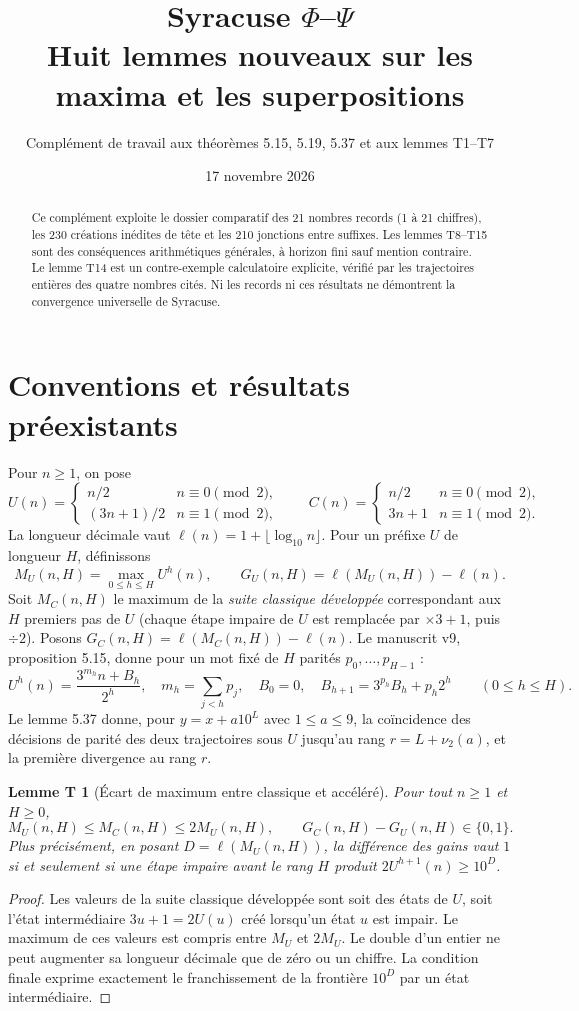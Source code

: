 \documentclass[11pt,a4paper]{article}
\title{Syracuse $\Phi$--$\Psi$\\Huit lemmes nouveaux sur les maxima et les superpositions}
\author{Complément de travail aux théorèmes 5.15, 5.19, 5.37 et aux lemmes T1--T7}
\date{17 novembre 2026}
\newtheorem{lemmet}{Lemme T}
\newcommand{\ellg}{\ell}
\newcommand{\UU}{U}
\newcommand{\CC}{C}
\begin{document}
\maketitle
\begin{abstract}
Ce complément exploite le dossier comparatif des 21 nombres records (1 à 21 chiffres), les 230 créations inédites de tête et les 210 jonctions entre suffixes. Les lemmes T8--T15 sont des conséquences arithmétiques générales, à horizon fini sauf mention contraire. Le lemme T14 est un contre-exemple calculatoire explicite, vérifié par les trajectoires entières des quatre nombres cités. Ni les records ni ces résultats ne démontrent la convergence universelle de Syracuse.
\end{abstract}

\section*{Conventions et résultats préexistants}
Pour $n\ge1$, on pose
\[
 \UU(n)=\begin{cases}n/2&n\equiv0\pmod2,\\(3n+1)/2&n\equiv1\pmod2,\end{cases}
 \qquad
 \CC(n)=\begin{cases}n/2&n\equiv0\pmod2,\\3n+1&n\equiv1\pmod2.\end{cases}
\]
La longueur décimale vaut $\ellg(n)=1+\lfloor\log_{10}n\rfloor$.
Pour un préfixe $\UU$ de longueur $H$, définissons
\[
 M_U(n,H)=\max_{0\le h\le H}\UU^h(n),\qquad
 G_U(n,H)=\ellg(M_U(n,H))-\ellg(n).
\]
Soit $M_C(n,H)$ le maximum de la \emph{suite classique développée} correspondant aux $H$ premiers pas de $\UU$ (chaque étape impaire de $\UU$ est remplacée par $\times3+1$, puis $\div2$). Posons $G_C(n,H)=\ellg(M_C(n,H))-\ellg(n)$.
Le manuscrit v9, proposition 5.15, donne pour un mot fixé de $H$ parités $p_0,\ldots,p_{H-1}$ :
\[
 \UU^h(n)=\frac{3^{m_h}n+B_h}{2^h},\quad
 m_h=\sum_{j<h}p_j,\quad B_0=0,\quad
 B_{h+1}=3^{p_h}B_h+p_h2^h\qquad(0\le h\le H).
\]
Le lemme 5.37 donne, pour $y=x+a10^L$ avec $1\le a\le9$, la coïncidence des décisions de parité des deux trajectoires sous $\UU$ jusqu'au rang $r=L+\nu_2(a)$, et la première divergence au rang $r$.

\begin{lemmet}[Écart de maximum entre classique et accéléré]
Pour tout $n\ge1$ et $H\ge0$,
\[
 \boxed{M_U(n,H)\le M_C(n,H)\le2M_U(n,H)},\qquad
 \boxed{G_C(n,H)-G_U(n,H)\in\{0,1\}}.
\]
Plus précisément, en posant $D=\ellg(M_U(n,H))$, la différence des gains vaut $1$ si et seulement si une étape impaire avant le rang $H$ produit $2\UU^{h+1}(n)\ge10^D$.
\end{lemmet}
\begin{proof}
Les valeurs de la suite classique développée sont soit des états de $\UU$, soit l'état intermédiaire $3u+1=2\UU(u)$ créé lorsqu'un état $u$ est impair. Le maximum de ces valeurs est compris entre $M_U$ et $2M_U$. Le double d'un entier ne peut augmenter sa longueur décimale que de zéro ou un chiffre. La condition finale exprime exactement le franchissement de la frontière $10^D$ par un état intermédiaire.
\end{proof}
\end{document}
